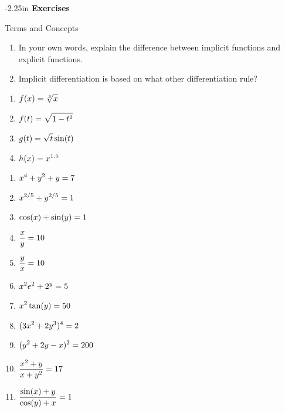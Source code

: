 \begin{adjustwidth*}{}{-2.25in}
\textbf{{\large Exercises}}
\setlength{\columnsep}{25pt}
\begin{multicols*}{2}
\noindent Terms and Concepts \small
\begin{enumerate}[1)]
\item In your own words, explain the difference between implicit functions and explicit functions.
\item Implicit differentiation is based on what other differentiation rule?
\end{enumerate} 

 \small


\begin{enumerate}[1),resume]
\item $\displaystyle f(x) = \sqrt[3]{x}$
\item $\displaystyle f(t) = \sqrt{1-t^2}$
\item $\displaystyle g(t) = \sqrt{t}\sin(t)$
\item $\displaystyle h(x) = x^{1.5}$
\end{enumerate}


\begin{enumerate}[1),resume]
\item $\displaystyle x^4+y^2+y=7$
\item $\displaystyle x^{2/5}+y^{2/5}=1$
\item $\displaystyle \cos (x)+\sin (y)=1$
\item $\displaystyle \frac{x}{y}=10$
\item $\displaystyle \frac{y}{x}=10$
\item $\displaystyle x^2e^2+2^y=5$
\item $\displaystyle x^2\tan(y)=50$
\item $\displaystyle (3 x^2+2 y^3)^4=2$
\item $\displaystyle (y^2+2y-x)^2=200$
\item $\displaystyle \frac{x^2+y}{x+y^2}=17$
\item $\displaystyle \frac{\sin (x)+y}{\cos (y)+x}=1$
\end{enumerate}



\end{multicols*}
\end{adjustwidth*}
